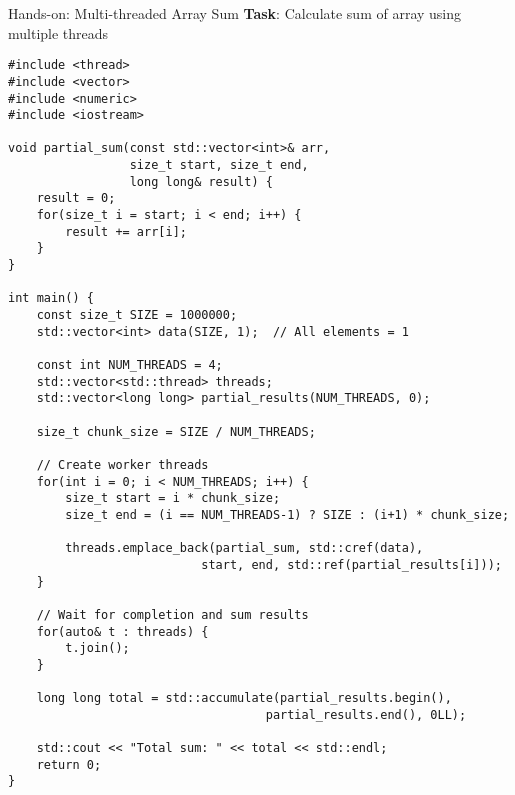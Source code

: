 \begin{frame}[fragile]{ Hands-on: Multi-threaded Array Sum}
	\textbf{Task}: Calculate sum of array using multiple threads

	\begin{verbatim}
#include <thread>
#include <vector>
#include <numeric>
#include <iostream>

void partial_sum(const std::vector<int>& arr,
                 size_t start, size_t end,
                 long long& result) {
    result = 0;
    for(size_t i = start; i < end; i++) {
        result += arr[i];
    }
}

int main() {
    const size_t SIZE = 1000000;
    std::vector<int> data(SIZE, 1);  // All elements = 1

    const int NUM_THREADS = 4;
    std::vector<std::thread> threads;
    std::vector<long long> partial_results(NUM_THREADS, 0);

    size_t chunk_size = SIZE / NUM_THREADS;

    // Create worker threads
    for(int i = 0; i < NUM_THREADS; i++) {
        size_t start = i * chunk_size;
        size_t end = (i == NUM_THREADS-1) ? SIZE : (i+1) * chunk_size;

        threads.emplace_back(partial_sum, std::cref(data),
                           start, end, std::ref(partial_results[i]));
    }

    // Wait for completion and sum results
    for(auto& t : threads) {
        t.join();
    }

    long long total = std::accumulate(partial_results.begin(),
                                    partial_results.end(), 0LL);

    std::cout << "Total sum: " << total << std::endl;
    return 0;
}
	\end{verbatim}
\end{frame}

